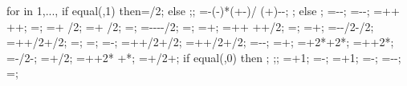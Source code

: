 {{{	for \iarr in {1,...,{\levelnumber}}{
		if equal(\iarr,1) then{\addtempy=\supportheight/2;} else {;};
		\arrstartx{\iarr}=-(\toparrlen-\basearrlen)*(\y{\iarr}+\isomidy-\addtempy)/
		(\structheight+\isomidy)-\latloadshift-\basearrlen;
	};
} else {};
\engbedrockstartx=-\leftsoildist-\engbedrockleftdist;
\engbedrockstarty=-\soilbelowfoundtof-\engbedrockdepth;
\engbedrockdeltax=\leftsoildist+\engbedrockleftdist+
\buildingwidth+\rightsoildist+\engbedrockrightdist;
\engbedrockdeltay=\engbedrockdepth;
\engbedrockmidx=\engbedrockstartx + \engbedrockdeltax/2;
\engbedrockmidy=\engbedrockstarty + \engbedrockdeltay/2;
\translayerlinet=\showtranslayer*\translayerlinet;
\translayerleftstartx=-\supportwidth-\hsdistleft-\leftsoildist-\translayerlinet/2;
\translayerleftstarty=\leftwallh;
\translayerleftdeltay=\leftwallh+\soilbelowfoundtof;
\translayerrightstartx=\supportwidth+\hsdistright+
	\rightsoildist+\buildingwidth+\translayerlinet/2;
\translayerrightstarty=\rightwallh;
\translayerrightdeltay=\rightwallh+\soilbelowfoundtof;
\ssinterleftstartx=-\supportwidth-\baselinet/2-\ssinterlinet/2;
\ssinterrightstartx=\buildingwidth+\supportwidth+\baselinet/2+\ssinterlinet/2;
\ssinterleftstarty=\leftwallh;
\ssinterrightstarty=\rightwallh;
\ssinterdeltax=\ssinterrightstartx-\ssinterleftstartx;
\ssinterleftdeltay=\leftwallh+\supportheight+\baselinet/2+\ssinterlinet/2;
\ssinterrightdeltay=\rightwallh+\supportheight+\baselinet/2+\ssinterlinet/2;
\markssleftstartx=-\supportwidth-\markssexspace;
\markssleftstarty=\basewalldepth+\markssexspace;
\markssdeltax=\buildingwidth+2*\supportwidth+2*\markssexspace;
\markssdeltay=\basewalldepth+\supportheight+2*\markssexspace;
\supershadestartx=-\collinet/2-\supershadespace;
\supershadestarty=\basewalldepth+\baselinet/2;
\supershadedeltax=\buildingwidth+\collinet+2*\supershadespace
 +*\showdefl;
\supershadedeltay=\superstorynumber*\storyheight+\beamlinet/2+\supershadespace;
if equal(\showlessbays,0) then {
;
;};
\startcol=\leftbays+1;
\endcol=\columnnumber-\rightbays;
\startbeam=\leftbays+1;
\endbeam=\baynumber-\rightbays;
\superbays=\baynumber-\leftbays-\rightbays;
\superwidth=\superbays*\baywidth;
}}
